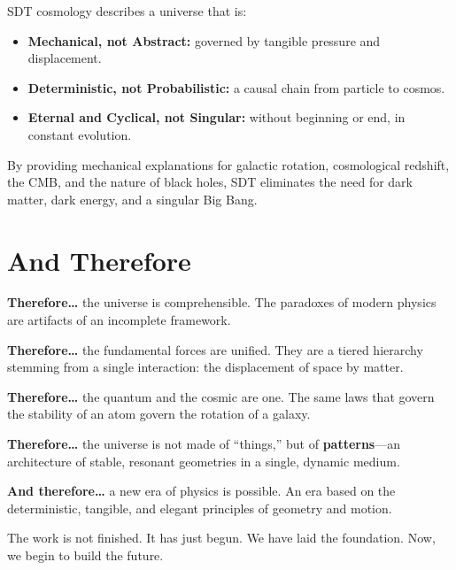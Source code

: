 SDT cosmology describes a universe that is:
\begin{itemize}
  \item \textbf{Mechanical, not Abstract:} governed by tangible pressure and displacement.
  \item \textbf{Deterministic, not Probabilistic:} a causal chain from particle to cosmos.
  \item \textbf{Eternal and Cyclical, not Singular:} without beginning or end, in constant evolution.
\end{itemize}

By providing mechanical explanations for galactic rotation, cosmological redshift, the CMB, and the nature of black holes, SDT eliminates the need for dark matter, dark energy, and a singular Big Bang.


\section*{And Therefore}

\textbf{Therefore\ldots} the universe is comprehensible.  The paradoxes of modern physics are artifacts of an incomplete framework.

\textbf{Therefore\ldots} the fundamental forces are unified.  They are a tiered hierarchy stemming from a single interaction: the displacement of space by matter.

\textbf{Therefore\ldots} the quantum and the cosmic are one.  The same laws that govern the stability of an atom govern the rotation of a galaxy.

\textbf{Therefore\ldots} the universe is not made of ``things,'' but of \textbf{patterns}---an architecture of stable, resonant geometries in a single, dynamic medium.

\textbf{And therefore\ldots} a new era of physics is possible.  An era based on the deterministic, tangible, and elegant principles of geometry and motion.

The work is not finished.  It has just begun.  We have laid the foundation.  Now, we begin to build the future.
